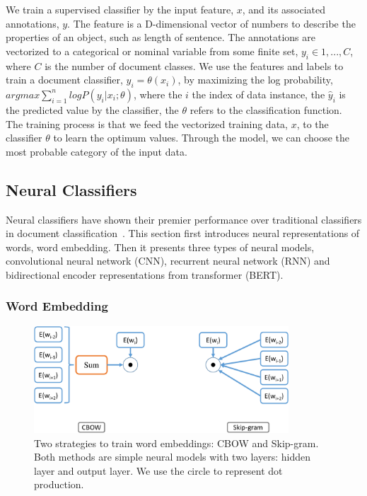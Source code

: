 We train a supervised classifier by the input feature, $x$, and its associated annotations, $y$. The feature is a D-dimensional vector of numbers to describe the properties of an object, such as length of sentence. The annotations are vectorized to a categorical or nominal variable from some finite set, $y_i \in {1, ..., C}$, where $C$ is the number of document classes. We use the features and labels to train a document classifier, $\hat{y}_i = \theta(x_i)$, by maximizing the log probability, $argmax\sum_{i=1}^nlog P(y_i | x_i; \theta)$, where the $i$ the index of data instance, the $\hat{y}_i$ is the predicted value by the classifier, the $\theta$ refers to the classification function. The training process is that we feed the vectorized training data, $x$, to the classifier $\theta$ to learn the optimum values. Through the model, we can choose the most probable category of the input data.


\subsection{Neural Classifiers}

Neural classifiers have shown their premier performance over traditional classifiers in document classification~\cite{mikolov2013distributed, kim2014convolutional}.
This section first introduces neural representations of words, word embedding.
Then it presents three types of neural models, convolutional neural network (CNN), recurrent neural network (RNN) and bidirectional encoder representations from transformer (BERT).

\subsubsection{Word Embedding}
\label{chap2:subsubsec:emb}

\begin{figure}[t!]
\centering
\includegraphics[width=0.85\textwidth]{images/chapter2/word2vec.pdf}
\caption{Two strategies to train word embeddings: CBOW and Skip-gram. Both methods are simple neural models with two layers: hidden layer and output layer. We use the circle to represent dot production.}
\label{chap2:fig:embd}
\end{figure}

